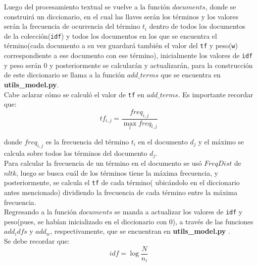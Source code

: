 \documentclass{llncs}
\begin{document}
Luego del procesamiento textual se vuelve a la funci\'on $documents$, donde se construir\'a un diccionario, en el cual las llaves ser\'an los t\'erminos y los valores ser\'an la frecuencia de ocurrencia del t\'ermino \texttt{$t_i$} dentro de todos los documentos de la colecci\'on(\texttt{idf}) y todos los documentos en los que se encuentra el t\'ermino(cada documento a su vez guardar\'a tambi\'en el valor del \texttt{tf} y peso(\texttt{w}) correspondiente a ese documento con ese t\'ermino), inicialmente los valores de \texttt{idf} y peso ser\'an 0 y posteriormente se calcular\'an y actualizar\'an, para la construcci\'on de este diccionario se llama a la funci\'on $add\_terms$ que se encuentra en \textbf{utils\_model.py}.\\

Cabe aclarar c\'omo se calcul\'o el valor de \texttt{tf} en $add\_terms$. Es importante recordar que:\\

\begin{equation}
	tf_{i,j} = \frac{freq_{i,j}}{\max_l freq_{l,j}}
\end{equation}

donde \texttt{$freq_{i,j}$} es la frecuencia del t\'ermino \texttt{$t_i$} en el documento \texttt{$d_j$} y el m\'aximo se calcula sobre todos los t\'erminos del documento \texttt{$d_j$}.\\


Para calcular la frecuencia de un t\'ermino en el documento se us\'o $FreqDist$ de $nltk$, luego se busca cu\'al de los t\'erminos tiene la m\'axima frecuencia, y posteriormente, se calcula el \texttt{tf} de cada t\'ermino( ubic\'andolo en el diccionario antes mencionado) dividiendo la frecuencia de cada t\'ermino entre la m\'axima frecuencia.\\

Regresando a la funci\'on $documents$ se manda a actualizar los valores de \texttt{idf} y peso(pues, se hab\'ian inicializado en el diccionario con 0), a trav\'es de las funciones $add_idfs$ y $add_w$, respectivamente, que se encuentran en \textbf{utils\_model.py} .\\
                                                                                                                                                                                              
Se debe recordar que:\\

\begin{equation}
	idf = \log \frac{N}{n_i}
\end{equation}  
\end{document}
